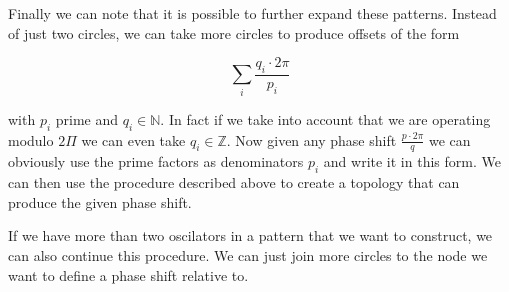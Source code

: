 Finally we can note that it is possible to further expand these patterns. Instead of just two circles, we can take more circles to produce offsets of the form

\[
  \sum_{i}{\frac{q_i {\cdot} 2 \pi}{p_i}}
\]

with $p_i$ prime and $q_i \in \mathbb{N}$. In fact if we take into account that we are operating modulo $2 \Pi$ we can even take $q_i \in \mathbb{Z}$. 
Now given any phase shift $\frac{p {\cdot} 2 \pi}{q}$ we can obviously use the prime factors as denominators $p_i$ and write it in this form. We can then use the procedure described above to create a topology that can produce the given phase shift. 

If we have more than two oscilators in a pattern that we want to construct, we can also continue this procedure. We can just join more circles to the node we want to define a phase shift relative to. 